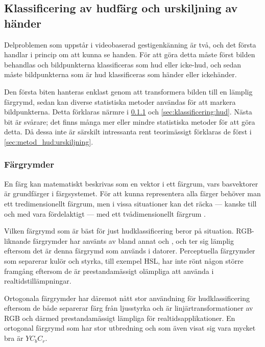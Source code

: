 \documentclass[../rapport_MVEX01-11-05]{subfiles}
\begin{document}
\subsection{Klassificering av hudfärg och urskiljning av händer}\label{sec:hudklassificering}

Delproblemen som uppstår i videobaserad gestigenkänning är två, och
det första handlar i princip om att kunna se handen. För att göra detta
måste först bilden behandlas och bildpunkterna klassificeras som hud eller
icke-hud, och sedan måste bildpunkterna som är hud klassificeras som händer
eller ickehänder.

Den första biten hanteras enklast genom att transformera bilden till en
lämplig färgrymd, sedan kan diverse statistiska metoder användas för att
markera bildpunkterna. Detta förklaras närmre i \ref{sec:klassificering:fargrymder}
och \ref{sec:klassificering:hud}. Nästa bit är svårare; det finns många
mer eller mindre statistiska metoder för att göra detta. Då dessa inte är
särskilt intressanta rent teorimässigt förklaras de först i
\ref{sec:metod_hud:urskiljning}.

\subsubsection{Färgrymder}\label{sec:klassificering:fargrymder}

En färg kan matematiskt beskrivas som en vektor i ett färgrum, vars
basvektorer är grundfärger i färgsystemet. För att kunna representera alla färger
behöver man ett tredimensionellt färgrum, men i vissa situationer kan
det räcka --- kanske till och med vara fördelaktigt --- med ett
tvådimensionellt färgrum \cite{Kakumanu07}.

Vilken färgrymd som är bäst för just hudklassificering beror på
situation. RGB-liknande färgrymder har använts av bland annat
 och , och ter sig lämplig
eftersom det är denna färgrymd som används i datorer. Perceptuella
färgrymder som separerar kulör och styrka, till exempel HSL, har inte
rönt någon större framgång eftersom de är prestandamässigt olämpliga
att använda i realtidstillämpningar.

Ortogonala färgrymder har däremot nått stor användning för
hudklassificering \cite{Hsu02,Elmezain08,Hassanpour08} eftersom de
både separerar färg från ljusstyrka och är linjärtransformationer av
RGB och därmed prestandamässigt lämpliga för realtidsapplikationer.
En ortogonal färgrymd som har stor utbredning och som även visat
sig vara mycket bra \cite{Kakumanu07} är $YC_bC_r$.
\end{document}
